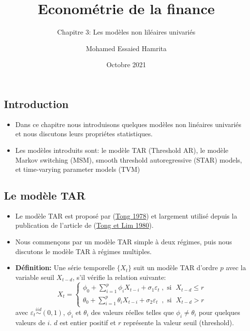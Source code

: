 \documentclass[
  french,
]{article}
\title{Econométrie de la finance}
\subtitle{Chapitre 3: Les modèles non liléaires univariés}
\author{Mohamed Essaied Hamrita}
\date{Octobre 2021}
\begin{document}
\maketitle

\hypertarget{introduction}{%
\subsection{Introduction}\label{introduction}}

\begin{itemize}
\item
  Dans ce chapitre nous introduisons quelques modèles non linéaires
  univariés et nous discutons leurs propriétes statistiques.
\item
  Les modèles introduits sont: le modèle TAR (Threshold AR), le modèle
  Markov switching (MSM), smooth threshold autoregressive (STAR) models,
  et time-varying parameter models (TVM)
\end{itemize}

\hypertarget{le-moduxe8le-tar}{%
\subsection{Le modèle TAR}\label{le-moduxe8le-tar}}

\begin{itemize}
\item
  Le modèle TAR est proposé par (\protect\hyperlink{ref-tong78}{Tong
  1978}) et largement utilisé depuis la publication de l'article de
  (\protect\hyperlink{ref-tong80}{Tong et Lim 1980}).
\item
  Nous commençons par un modèle TAR simple à deux régimes, puis nous
  discutons le modèle TAR à régimes multiples.
\item
  \textbf{Définition:} Une série temporelle \(\{X_t\}\) suit un modèle
  TAR d'ordre \(p\) avec la variable seuil \(X_{t-d}\), s'il vérifie la
  relation suivante: \[
  X_t=\begin{cases}
  \phi_0+\displaystyle\sum_{i=1}^p\phi_iX_{t-i}+\sigma_1\varepsilon_t \;,\text{ si }\; X_{t-d} \leq r\\
  \theta_0+\displaystyle\sum_{i=1}^p\theta_iX_{t-i}+\sigma_2\varepsilon_t \;\;,\text{ si }\; X_{t-d} > r
  \end{cases}
  \] avec \(\varepsilon_t \stackrel{iid}{\sim}(0,1)\), \(\phi_i\) et
  \(\theta_i\) des valeurs réelles telles que \(\phi_i \neq \theta_i\)
  pour quelques valeurs de \(i\). \(d\) est entier positif et \(r\)
  représente la valeur seuil (threshold).
\end{itemize}
\end{document}
